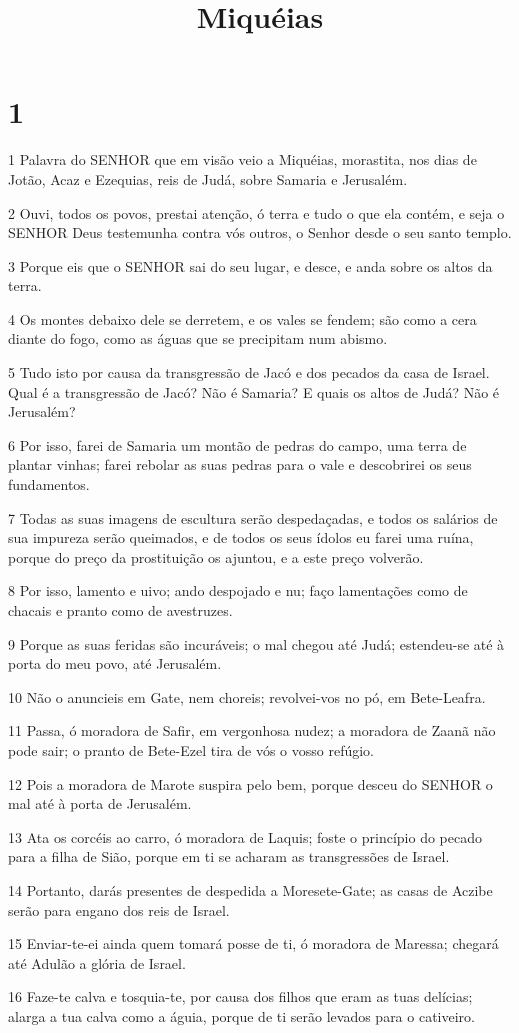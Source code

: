 

\title{Miquéias}


\chapter{1}

\par 1 Palavra do SENHOR que em visão veio a Miquéias, morastita, nos dias de Jotão, Acaz e Ezequias, reis de Judá, sobre Samaria e Jerusalém.
\par 2 Ouvi, todos os povos, prestai atenção, ó terra e tudo o que ela contém, e seja o SENHOR Deus testemunha contra vós outros, o Senhor desde o seu santo templo.
\par 3 Porque eis que o SENHOR sai do seu lugar, e desce, e anda sobre os altos da terra.
\par 4 Os montes debaixo dele se derretem, e os vales se fendem; são como a cera diante do fogo, como as águas que se precipitam num abismo.
\par 5 Tudo isto por causa da transgressão de Jacó e dos pecados da casa de Israel. Qual é a transgressão de Jacó? Não é Samaria? E quais os altos de Judá? Não é Jerusalém?
\par 6 Por isso, farei de Samaria um montão de pedras do campo, uma terra de plantar vinhas; farei rebolar as suas pedras para o vale e descobrirei os seus fundamentos.
\par 7 Todas as suas imagens de escultura serão despedaçadas, e todos os salários de sua impureza serão queimados, e de todos os seus ídolos eu farei uma ruína, porque do preço da prostituição os ajuntou, e a este preço volverão.
\par 8 Por isso, lamento e uivo; ando despojado e nu; faço lamentações como de chacais e pranto como de avestruzes.
\par 9 Porque as suas feridas são incuráveis; o mal chegou até Judá; estendeu-se até à porta do meu povo, até Jerusalém.
\par 10 Não o anuncieis em Gate, nem choreis; revolvei-vos no pó, em Bete-Leafra.
\par 11 Passa, ó moradora de Safir, em vergonhosa nudez; a moradora de Zaanã não pode sair; o pranto de Bete-Ezel tira de vós o vosso refúgio.
\par 12 Pois a moradora de Marote suspira pelo bem, porque desceu do SENHOR o mal até à porta de Jerusalém.
\par 13 Ata os corcéis ao carro, ó moradora de Laquis; foste o princípio do pecado para a filha de Sião, porque em ti se acharam as transgressões de Israel.
\par 14 Portanto, darás presentes de despedida a Moresete-Gate; as casas de Aczibe serão para engano dos reis de Israel.
\par 15 Enviar-te-ei ainda quem tomará posse de ti, ó moradora de Maressa; chegará até Adulão a glória de Israel.
\par 16 Faze-te calva e tosquia-te, por causa dos filhos que eram as tuas delícias; alarga a tua calva como a águia, porque de ti serão levados para o cativeiro.

